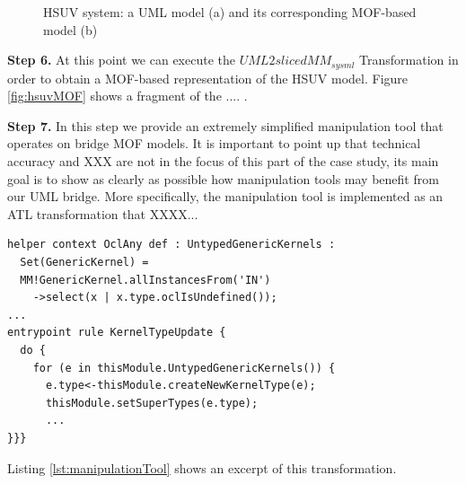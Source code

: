\begin{figure}
  \caption{HSUV system: a UML model (a) and its corresponding MOF-based model (b)}
  \label{fig:hsuv}
\end{figure}
%
\textbf{Step 6.} At this point we can execute the $UML2slicedMM_{sysml}$ Transformation in order to obtain a MOF-based representation
of the HSUV model. Figure \ref{fig:hsuvMOF} shows a fragment of the .... .

\textbf{Step 7.} In this step we provide an extremely simplified manipulation tool that operates on bridge MOF models. 
It is important to point up that technical accuracy and XXX are not in the focus of this part of the case study, 
its main goal is to show as clearly as possible how manipulation tools may benefit from our UML bridge. 
More specifically, the manipulation tool is implemented as an ATL transformation that XXXX...
%
\begin{lstlisting}[breaklines,style=AMMA,language=ATL,mathescape,rulesepcolor=\color{black},caption=ATL transformation working on MOF-based SysML models,captionpos=b,label={lst:manipulationTool}]
helper context OclAny def : UntypedGenericKernels : 
  Set(GenericKernel) = 
  MM!GenericKernel.allInstancesFrom('IN')
    ->select(x | x.type.oclIsUndefined());
...
entrypoint rule KernelTypeUpdate {
  do {
    for (e in thisModule.UntypedGenericKernels()) {
      e.type<-thisModule.createNewKernelType(e);
      thisModule.setSuperTypes(e.type);
      ...
}}}
\end{lstlisting}

Listing \ref{lst:manipulationTool} shows an excerpt of this transformation. 



